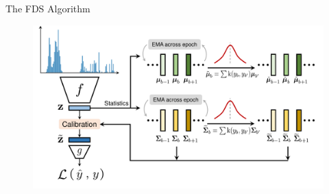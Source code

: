 \begin{frame}{The FDS Algorithm}
	\begin{figure}[h]
		\includegraphics[width=\linewidth]{images/teaser_fds.pdf}
	\end{figure}
\end{frame}